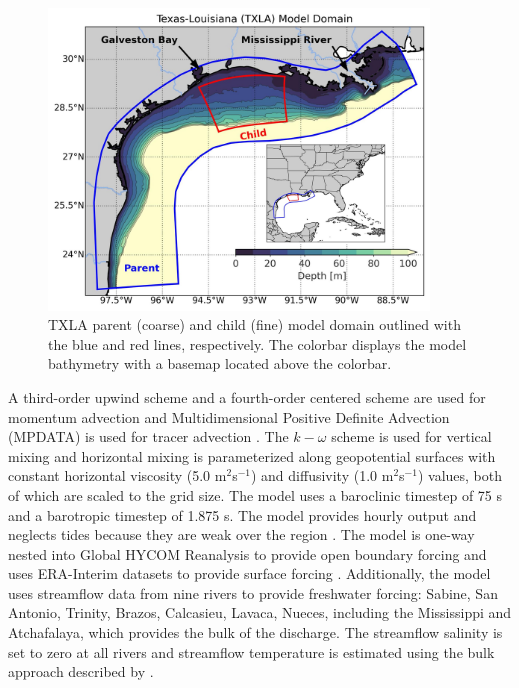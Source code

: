 \begin{figure}[h]
    \centerline{\includegraphics[width=0.9\textwidth]{figures/james_2023/Figure1_domain.jpg}}
    \caption{TXLA parent (coarse) and child (fine) model domain outlined with the blue and red lines, respectively. The colorbar displays the model bathymetry with a basemap located above the colorbar.}
    \label{fig:domain_overview}
\end{figure}

A third-order upwind scheme and a fourth-order centered scheme are used for momentum advection and Multidimensional Positive Definite Advection (MPDATA) is used for tracer advection \citep{Smolarkiewicz_1998}. The $k-\omega$ scheme is used for vertical mixing \citep{umlauf2003extending, Warner_2005} and horizontal mixing is parameterized along geopotential surfaces with constant horizontal viscosity (5.0 m$^2$s$^{-1}$) and diffusivity (1.0 m$^2$s$^{-1}$) values, both of which are scaled to the grid size. The model uses a baroclinic timestep of 75 s and a barotropic timestep of 1.875 s. The model provides hourly output and neglects tides because they are weak over the region \citep{DiMarco_1998}. The model is one-way nested into Global HYCOM Reanalysis to provide open boundary forcing and uses ERA-Interim datasets to provide surface forcing \citep{Dee_2011}. Additionally, the model uses streamflow data from nine rivers to provide freshwater forcing: Sabine, San Antonio, Trinity, Brazos, Calcasieu, Lavaca, Nueces, including the Mississippi and Atchafalaya, which provides the bulk of the discharge. The streamflow salinity is set to zero at all rivers and streamflow temperature is estimated using the bulk approach described by \citep{Stefan_1993}.

